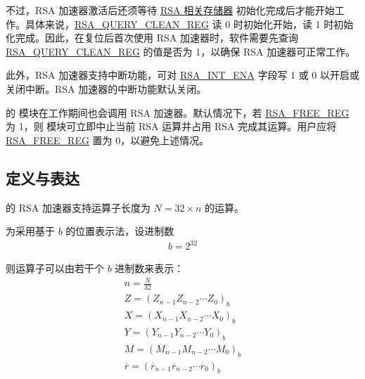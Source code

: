\documentclass[main\_\_CN.tex]{subfiles}
\begin{document}
不过，RSA 加速器激活后还须等待 \hyperref[sec:mem-sum]{RSA 相关存储器} 初始化完成后才能开始工作。具体来说，\hyperref[regdesc:RSAQUERYCLEANREG]{RSA\_QUERY\_CLEAN\_REG} 读 0 时初始化开始，读 1 时初始化完成。因此，在复位后首次使用 RSA 加速器时，软件需要先查询 \hyperref[regdesc:RSAQUERYCLEANREG]{RSA\_QUERY\_CLEAN\_REG} 的值是否为 1，以确保 RSA 加速器可正常工作。

此外，RSA 加速器支持中断功能，可对 \hyperref[fielddesc:RSAINTENA]{RSA\_INT\_ENA} 字段写 1 或 0 以开启或关闭中断。RSA 加速器的中断功能默认关闭。

\begin{importantlisting}
\vspace{-0.5em}

    \chipname{} 的  模块在工作期间也会调用 RSA 加速器。默认情况下，若 \hyperref[regdesc:RSAFREEREG]{RSA\_FREE\_REG} 为 1，则  模块可立即中止当前 RSA 运算并占用 RSA 完成其运算。用户应将 \hyperref[regdesc:RSAFREEREG]{RSA\_FREE\_REG} 置为 0，以避免上述情况。
\end{importantlisting}

\subsection{定义与表达} \label{sec:rsa-definitions-representations}
\chipname{} 的 RSA 加速器支持运算子长度为
\begin{math}N = 32 \times n\end{math} 的运算。

为采用基于 \begin{math}b\end{math} 的位置表示法，设进制数
\begin{gather*}
    b = 2^{32}
\end{gather*}

则运算子可以由若干个 \begin{math}b\end{math} 进制数来表示：
\begin{gather*}
    n = \frac{N}{32} \\
    Z = ( Z_{n-1} Z_{n-2} \cdots Z_{0} )_{b} \\
    X = ( X_{n-1} X_{n-2} \cdots X_{0} )_{b} \\
    Y = ( Y_{n-1} Y_{n-2} \cdots Y_{0} )_{b} \\
    M = ( M_{n-1} M_{n-2} \cdots M_{0} )_{b} \\
    \overline{r} = ( \overline{r}_{n-1} \overline{r}_{n-2} \cdots \overline{r}_{0} )_{b}
\end{gather*}
\end{document}
